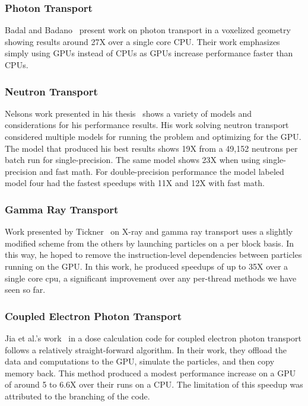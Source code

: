 \subsubsection*{\textbf{Photon Transport}}
%
Badal and Badano~\cite{badal2009accelerating} present work on photon transport in a voxelized geometry showing results around 27X over a single core CPU.
%
Their work emphasizes simply using GPUs instead of CPUs as GPUs increase performance faster than CPUs.
%

\subsubsection*{\textbf{Neutron Transport}}
%
Nelsons work presented in his thesis~\cite{nelson2009monte} shows a variety of models and considerations for his performance results.
%
His work solving neutron transport considered multiple models for running the problem and optimizing for the GPU.
%
The model that produced his best results shows 19X from a 49,152 neutrons per batch run for single-precision.
%
The same model shows 23X when using single-precision and fast math.
%
For double-precision performance the model labeled model four had the fastest speedups with 11X and 12X with fast math.
%

\subsubsection*{\textbf{Gamma Ray Transport}}
%
Work presented by Tickner~\cite{tickner2010monte} on X-ray and gamma ray transport uses a slightly modified scheme from the others by launching particles on a per block basis.
%
In this way, he hoped to remove the instruction-level dependencies between particles running on the GPU.
%
In this work, he produced speedups of up to 35X over a single core cpu, a significant improvement over any per-thread methods we have seen so far.
%

\subsubsection*{\textbf{Coupled Electron Photon Transport}}
%
Jia et al.'s  work~\cite{jia2010development} in a dose calculation code for coupled electron photon transport follows a relatively straight-forward algorithm.
%
In their work, they offload the data and computations to the GPU, simulate the particles, and then copy memory back.
This method produced a modest performance increase on a GPU of around 5 to 6.6X over their runs on a CPU.
%
The limitation of this speedup was attributed to the branching of the code.

